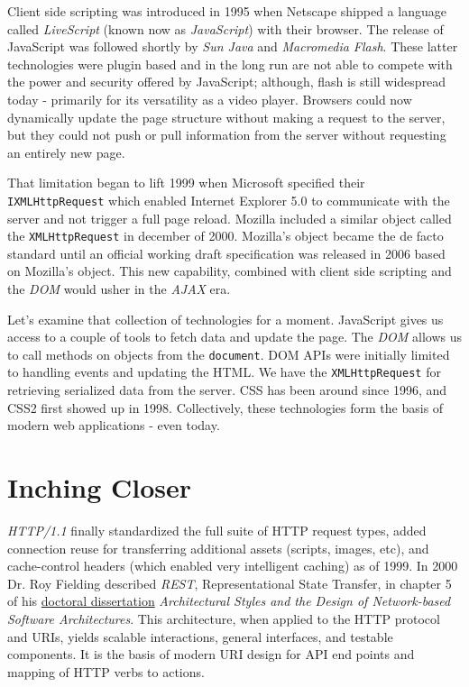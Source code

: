 \documentclass[12pt,letterpaper,fleqn]{article}
\newcommand{\jurl}[2]{\textcolor{myblue}{\href{#2}{#1}}}
\newcommand{\code}[1]{\texttt{#1}}
\begin{document}
Client side scripting was introduced in 1995 when Netscape shipped a language called \textit{LiveScript} (known now as \textit{JavaScript}) with their browser. The release of JavaScript was followed shortly by \textit{Sun Java} and \textit{Macromedia Flash}. These latter technologies were plugin based and in the long run are not able to compete with the power and security offered by JavaScript; although, flash is still widespread today - primarily for its versatility as a video player. Browsers could now dynamically update the page structure without making a request to the server, but they could not push or pull information from the server without requesting an entirely new page.

That limitation began to lift 1999 when Microsoft specified their \code{IXMLHttpRequest} which enabled Internet Explorer 5.0 to communicate with the server and not trigger a full page reload. Mozilla included a similar object called the \code{XMLHttpRequest} in december of 2000. Mozilla's object became the de facto standard until an official working draft specification was released in 2006 based on Mozilla's object. This new capability, combined with client side scripting and the \textit{DOM} would usher in the \textit{AJAX} era.

Let's examine that collection of technologies for a moment. JavaScript gives us access to a couple of tools to fetch data and update the page. The \textit{DOM}  allows us to call methods on objects from the \code{document}. DOM APIs were initially limited to handling events and updating the HTML. We have the \code{XMLHttpRequest} for retrieving serialized data from the server. CSS has been around since 1996, and CSS2 first showed up in 1998. Collectively, these technologies form the basis of modern web applications - even today.

\section*{Inching Closer}

\textit{HTTP/1.1} finally standardized the full suite of HTTP request types, added connection reuse for transferring additional assets (scripts, images, etc), and cache-control headers (which enabled very intelligent caching) as of 1999. In 2000 Dr. Roy Fielding described \textit{REST}, Representational State Transfer, in chapter 5 of his \jurl{doctoral dissertation}{http://www.ics.uci.edu/~fielding/pubs/dissertation/top.htm} \textit{Architectural Styles and the Design of Network-based Software Architectures}. This architecture, when applied to the HTTP protocol and URIs, yields scalable interactions, general interfaces, and testable components. It is the basis of modern URI design for API end points and mapping of HTTP verbs to actions.
\end{document}
